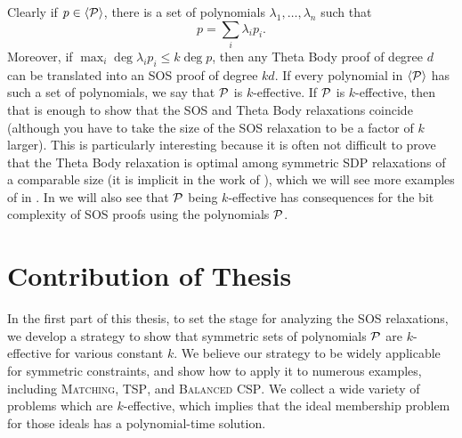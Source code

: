 Clearly if $p \in \langle \mathcal P \rangle$, there is a set of polynomials $\lambda_1, \dots, \lambda_n$ such that 
\[p = \sum_i \lambda_i p_i.\]
Moreover, if $\max_i \deg \lambda_ip_i \leq k\deg p$, then any Theta Body proof of degree $d$ can be translated into an SOS proof of degree $kd$.
If every polynomial in $\langle \mathcal P \rangle$ has such a set of polynomials, we say that $\mathcal P$ is $k$-effective. 
If $\mathcal P$ is $k$-effective, then that is enough to show that the SOS and Theta Body relaxations coincide (although you have to take the size of the SOS relaxation to be a factor of $k$ larger).
This is particularly interesting because it is often not difficult to prove that the Theta Body relaxation is optimal among symmetric SDP relaxations of a comparable size (it is implicit in the work of \cite{LRST14}), which we will see more examples of in . In  we will also see that $\mathcal P$ being $k$-effective has consequences for the bit complexity of SOS proofs using the polynomials $\mathcal P$.

\section{Contribution of Thesis}\label{sec:intro_contrib}

In the first part of this thesis, to set the stage for analyzing the SOS relaxations, we develop a strategy to show that symmetric sets of polynomials $\mathcal P$ are $k$-effective for various constant $k$.
We believe our strategy to be widely applicable for symmetric constraints, and show how to apply it to numerous examples, including \textsc{Matching}, \textsc{TSP}, and \textsc{Balanced CSP}.
We collect a wide variety of problems which are $k$-effective, which implies that the ideal membership problem for those ideals has a polynomial-time solution.


